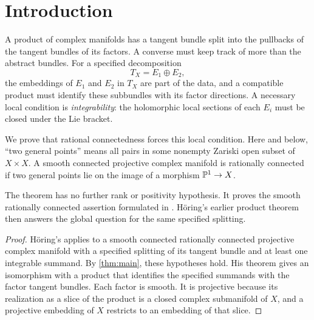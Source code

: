 \section{Introduction}

A product of complex manifolds has a tangent bundle split into the
pullbacks of the tangent bundles of its factors. A converse must keep
track of more than the abstract bundles. For a specified decomposition
\[
T_X=E_1\oplus E_2,
\]
the embeddings of \(E_1\) and \(E_2\) in \(T_X\) are part of the data,
and a compatible product must identify these subbundles with its factor
directions. A necessary local condition is \emph{integrability}:
the holomorphic local sections of each \(E_i\) must be closed under
the Lie bracket.

We prove that rational connectedness forces this local condition.
Here and below, ``two general points'' means all pairs in some nonempty
Zariski open subset of \(X\times X\). A smooth connected projective complex
manifold is rationally connected if two general points lie on the image
of a morphism \(\mathbb P^1\to X\).


The theorem has no further rank or positivity hypothesis. It proves the
smooth rationally connected assertion formulated in
\cite[Conjecture~1.5]{Hor26}. H\"oring's earlier product theorem then
answers the global question for the same specified splitting.


\begin{proof}
H\"oring's \cite[Theorem~1.4]{Hor07} applies to a smooth connected
rationally connected projective complex manifold with a specified
splitting of its tangent bundle and at least one integrable summand.
By \cref{thm:main}, these hypotheses hold. His theorem gives an
isomorphism with a product that identifies the specified summands with
the factor tangent bundles. Each factor is smooth. It is projective
because its realization as a slice of the product is a closed complex
submanifold of \(X\), and a projective embedding of \(X\) restricts
to an embedding of that slice.
\end{proof}

